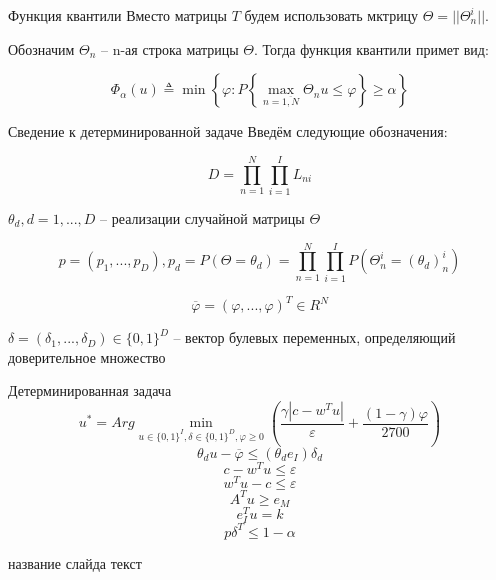 \documentclass[aspectratio=169]{beamer}
\begin{document}
    \begin{frame}{Функция квантили}
        Вместо матрицы $T$ будем использовать мктрицу $\Theta=||\Theta_n^i||$.
        
        Обозначим $\Theta_n$ -- n-ая строка матрицы $\Theta$. Тогда функция квантили примет вид:
        
        $$\Phi_\alpha(u)\triangleq\min\left\{\varphi:P\left\{\max_{n=\overline{1,N}}\Theta_n u\leq\varphi\right\}\geq\alpha\right\}$$
    \end{frame}
    
    \begin{frame}{Сведение к детерминированной задаче}
        Введём следующие обозначения:
        
        $$D=\prod_{n=1}^N\prod_{i=1}^I L_{ni}$$
        
		$\theta_d, d=1,...,D$ -- реализации случайной матрицы $\Theta$
        
        $$p=(p_1,...,p_D), p_d = P(\Theta=\theta_d)=\prod_{n=1}^N\prod_{i=1}^I P(\Theta_n^i=(\theta_d)_n^i)$$
        
        $$\overline{\varphi}=(\varphi,...,\varphi)^T\in R^N$$
        
        $\delta=(\delta_1,...,\delta_D)\in\{0,1\}^D$ -- вектор булевых переменных, определяющий доверительное множество
    \end{frame}

    \begin{frame}{Детерминированная задача}
        $$u^* = Arg\min_{u\in\{0, 1\}^I, \delta\in\{0, 1\}^D, \varphi\geq 0}\left(\frac{\gamma\left|c-w^T u\right|}{\varepsilon} + \frac{(1-\gamma)\varphi}{2700}\right)$$
        $$\theta_d u - \overline{\varphi}\leq(\theta_d e_I)\delta_d$$
        $$c-w^T u\leq\varepsilon$$
        $$w^T u-c\leq\varepsilon$$
        $$A^T u\geq e_M$$
        $$e_I^T u=k$$
        $$p\delta^T \leq 1-\alpha$$
    \end{frame}

    \begin{frame}{название слайда}
        текст\\
    \end{frame}
    
\end{document}
